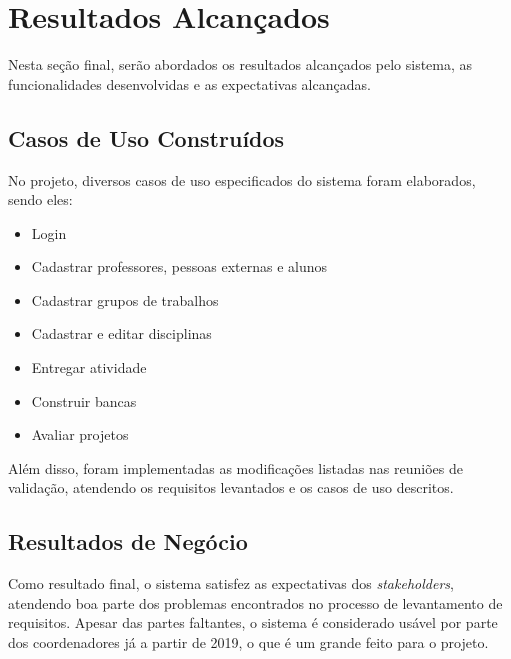 \section{Resultados Alcançados}
Nesta seção final, serão abordados os resultados alcançados pelo sistema, as funcionalidades desenvolvidas e as expectativas alcançadas.

\subsection{Casos de Uso Construídos}
No projeto, diversos casos de uso especificados do sistema foram elaborados, sendo eles:

\begin{itemize}
    \item Login
    \item Cadastrar professores, pessoas externas e alunos
    \item Cadastrar grupos de trabalhos
    \item Cadastrar e editar disciplinas
    \item Entregar atividade
    \item Construir bancas
    \item Avaliar projetos
\end{itemize}

Além disso, foram implementadas as modificações listadas nas reuniões de validação, atendendo os requisitos levantados e os casos de uso descritos.

\subsection{Resultados de Negócio}
Como resultado final, o sistema satisfez as expectativas dos \textit{stakeholders}, atendendo boa parte dos problemas encontrados no processo de levantamento de requisitos. Apesar das partes faltantes, o sistema é considerado usável por parte dos coordenadores já a partir de 2019, o que é um grande feito para o projeto.

